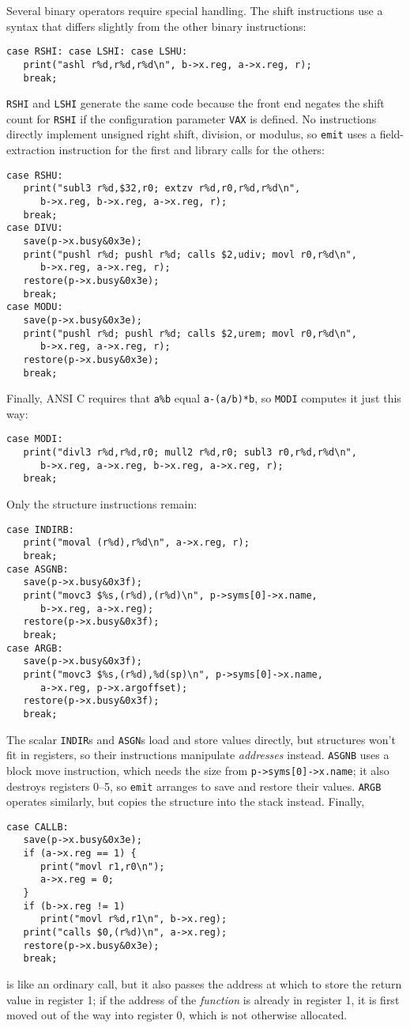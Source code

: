 Several binary operators require special handling. The shift
instructions use a syntax that differs slightly from the other binary instructions:
\begin{verbatim}
case RSHI: case LSHI: case LSHU:
   print("ashl r%d,r%d,r%d\n", b->x.reg, a->x.reg, r);
   break;
\end{verbatim}
\verb|RSHI| and \verb|LSHI| generate the same code because the front
end negates the shift count for \verb|RSHI| if the configuration
parameter \verb|VAX| is defined. No instructions directly
implement unsigned right shift, division, or modulus, so \verb|emit|
uses a field-extraction instruction for the first and library calls for the others:
\begin{verbatim}
case RSHU:
   print("subl3 r%d,$32,r0; extzv r%d,r0,r%d,r%d\n",
      b->x.reg, b->x.reg, a->x.reg, r);
   break;
case DIVU:
   save(p->x.busy&0x3e);
   print("pushl r%d; pushl r%d; calls $2,udiv; movl r0,r%d\n",
      b->x.reg, a->x.reg, r);
   restore(p->x.busy&0x3e);
   break;
case MODU:
   save(p->x.busy&0x3e);
   print("pushl r%d; pushl r%d; calls $2,urem; movl r0,r%d\n",
      b->x.reg, a->x.reg, r);
   restore(p->x.busy&0x3e);
   break;
\end{verbatim}
Finally, ANSI C requires that \verb|a%b| equal \verb|a-(a/b)*b|,
so \verb|MODI| computes it just this way:
\begin{verbatim}
case MODI:
   print("divl3 r%d,r%d,r0; mull2 r%d,r0; subl3 r0,r%d,r%d\n",
      b->x.reg, a->x.reg, b->x.reg, a->x.reg, r);
   break;
\end{verbatim}

Only the structure instructions remain:
\begin{verbatim}
case INDIRB:
   print("moval (r%d),r%d\n", a->x.reg, r);
   break;
case ASGNB:
   save(p->x.busy&0x3f);
   print("movc3 $%s,(r%d),(r%d)\n", p->syms[0]->x.name,
      b->x.reg, a->x.reg);
   restore(p->x.busy&0x3f);
   break;
case ARGB:
   save(p->x.busy&0x3f);
   print("movc3 $%s,(r%d),%d(sp)\n", p->syms[0]->x.name,
      a->x.reg, p->x.argoffset);
   restore(p->x.busy&0x3f);
   break;
\end{verbatim}
The scalar \verb|INDIR|s and \verb|ASGN|s load and store values
directly, but structures won't fit in registers, so their instructions
manipulate {\em addresses} instead. \verb|ASGNB| uses a
block move instruction, which needs the size from
\verb|p->syms[0]->x.name|; it also destroys registers 0--5, so
\verb|emit| arranges to save and restore their values. \verb|ARGB|
operates similarly, but copies the structure into the stack instead.
Finally,
\begin{verbatim}
case CALLB:
   save(p->x.busy&0x3e);
   if (a->x.reg == 1) {
      print("movl r1,r0\n");
      a->x.reg = 0;
   }
   if (b->x.reg != 1)
      print("movl r%d,r1\n", b->x.reg);
   print("calls $0,(r%d)\n", a->x.reg);
   restore(p->x.busy&0x3e);
   break;
\end{verbatim}
is like an ordinary call, but it also passes the address at which to
store the return value in register 1; if the address of the {\em function}
is already in register 1, it is first moved out of the way into
register 0, which is not otherwise allocated.


